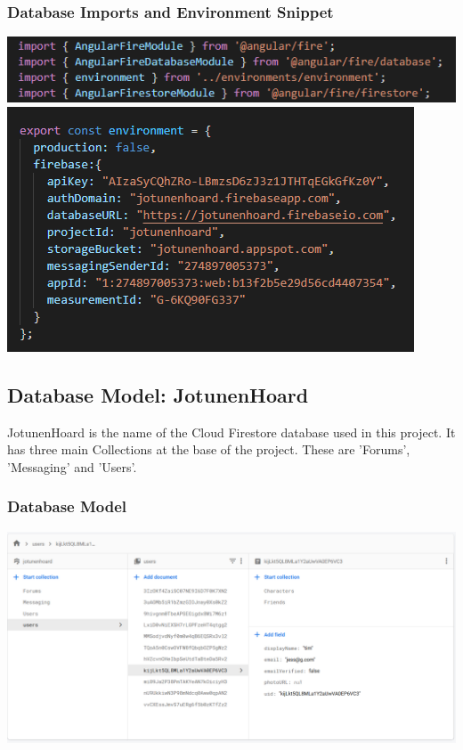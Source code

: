 \subsubsection{Database Imports and Environment Snippet}
\includegraphics[scale=1]{./img/firebaseImports.png}
\includegraphics[scale=1]{./img/environment.png}

\subsection{Database Model: JotunenHoard}
JotunenHoard is the name of the Cloud Firestore database used in this project. It has three main Collections at the base of the project. These are 'Forums', 'Messaging' and 'Users'.
\subsubsection{Database Model}
\includegraphics[scale=0.3]{./img/Database.png}
